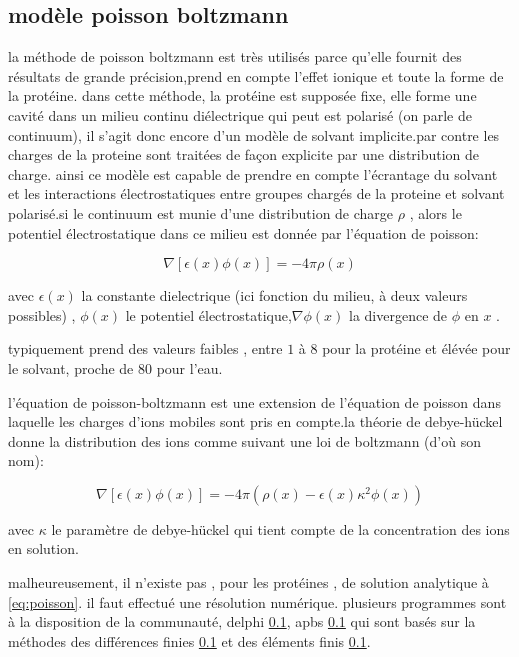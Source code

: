 \subsection{modèle poisson boltzmann}
la méthode de poisson boltzmann est très utilisés parce qu'elle fournit des résultats de grande précision,prend en compte l'effet ionique et toute la forme de la protéine. dans cette méthode, la protéine est supposée fixe, elle forme une cavité dans un milieu continu diélectrique qui peut est polarisé (on parle de continuum), il s'agit donc encore d'un modèle de solvant implicite.par contre les charges de la  proteine sont traitées de façon explicite par une distribution de charge. ainsi ce modèle est capable de prendre en compte l'écrantage du solvant et les interactions électrostatiques entre groupes chargés de la proteine et solvant polarisé.si le continuum est munie d'une distribution de charge $\rho$ , alors le potentiel électrostatique dans ce milieu est donnée par l'équation de poisson:

\begin{equation}
  \label{eq:poisson}
  \nabla [ \epsilon(x) \phi(x)] = - 4 \pi \rho(x)   
\end{equation}

avec $\epsilon(x)$ la constante dielectrique (ici fonction du milieu, à deux valeurs possibles) , $\phi (x)$ le potentiel électrostatique,$\nabla \phi(x)$ la divergence de $\phi$ en $x$ .

typiquement \epsilon prend des valeurs faibles , entre $1$ à $8$ pour la protéine et élévée pour le solvant, proche de $80$ pour l'eau.

l'équation de poisson-boltzmann est une extension de l'équation de poisson dans laquelle les charges d'ions mobiles sont pris en compte.la théorie de debye-hückel donne la distribution des ions comme suivant une loi de boltzmann (d'où son nom):

\begin{equation}
  \nabla [ \epsilon (x) \phi(x)] = -4 \pi ( \rho(x) - \epsilon(x) \kappa^2 \phi(x))
\end{equation}

avec $ \kappa $ le paramètre de debye-hückel qui tient compte de la concentration des ions en solution.


malheureusement, il n'existe pas , pour les protéines , de solution analytique à \ref{eq:poisson}. il faut effectué une résolution numérique. plusieurs programmes sont à la disposition de la communauté, delphi \ref{}, apbs \ref{}  qui sont basés sur la méthodes des différences finies \ref{} et des éléments finis \ref{}.

